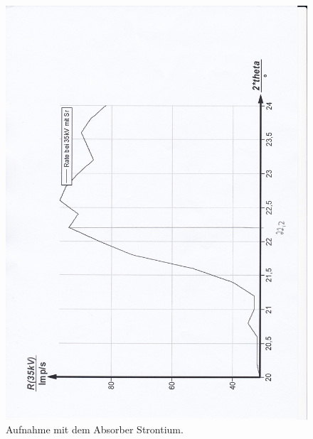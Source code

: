 \begin{figure}[p]
  \centering
  \includegraphics[width=\textwidth]{content/Strontium.jpg}
  \caption{Aufnahme mit dem Absorber Strontium.}
  \label{Bild:4}
\end{figure}
